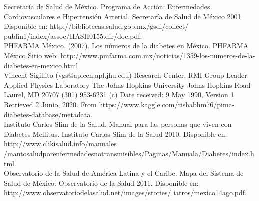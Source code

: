 \documentclass[letterpaper, 10 pt, conference]{ieeeconf}
\begin{document}
\begin{thebibliography}{}

 Secretaría de Salud de México. Programa de Acción: Enfermedades Cardiovasculares e Hipertensión Arterial. Secretaría de Salud de México 2001. Disponible en: http://bibliotecas.salud.gob.mx/gsdl/collect/
publin1/index/assoc/HASH0155.dir/doc.pdf.\\

 PHFARMA México. (2007). Los números de la diabetes en México. PHFARMA México Sitio web: http://www.pmfarma.com.mx/noticias/1359-los-numeros-de-la-diabetes-en-mexico.html\\

 Vincent Sigillito (vgs@aplcen.apl.jhu.edu) Research Center, RMI Group Leader Applied Physics Laboratory The Johns Hopkins University Johns Hopkins Road Laurel, MD 20707 (301) 953-6231 (c) Date received: 9 May 1990, Version 1. Retrieved 2 Junio, 2020. From https://www.kaggle.com/rishabhm76/pima-diabetes-database/metadata.\\

  Instituto Carlos Slim de la Salud. Manual para las personas que viven con Diabetes Mellitus. Instituto Carlos Slim de la Salud 2010. Disponible en: http://www.clikisalud.info/manuales
/mantosaludporenfermedadesnotransmisibles/Paginas/Manuala/Diabetes/index.html.\\

 Observatorio de la Salud de América Latina y el Caribe. Mapa del Sistema de Salud de México. Observatorio de la Salud 2011. Disponible en: http://www.observatoriodelasalud.net/images/stories/
iatros/mexico14ago.pdf.\\

\end{thebibliography}{}
\end{document}
